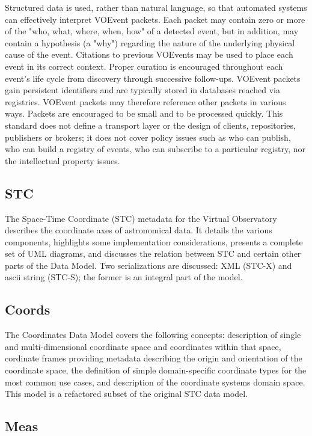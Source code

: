 \documentclass[11pt,a4paper]{ivoa}
\begin{document}
Structured data is used, rather than natural language, so that automated systems can effectively 
interpret VOEvent packets. Each packet may contain zero or more of the "who, what, where, when, how" 
of a detected event, but in addition, may contain a hypothesis (a "why") regarding the nature of 
the underlying physical cause of the event. Citations to previous VOEvents may be used to place 
each event in its correct context. Proper curation is encouraged throughout each event's life 
cycle from discovery through successive follow-ups. VOEvent packets gain persistent identifiers 
and are typically stored in databases reached via registries. VOEvent packets may therefore 
reference other packets in various ways. Packets are encouraged to be small and to be processed 
quickly. This standard does not define a transport layer or the design of clients, repositories, 
publishers or brokers; it does not cover policy issues such as who can publish, who can build a 
registry of events, who can subscribe to a particular registry, nor the intellectual property issues. 

\subsection{STC}

The Space-Time Coordinate (STC) metadata for the Virtual Observatory describes the coordinate 
axes of astronomical data. It details the various components, highlights some implementation 
considerations, presents a complete set of UML diagrams, and discusses the relation between 
STC and certain other parts of the Data Model. Two serializations are discussed: XML (STC-X) and
ascii string (STC-S); the former is an integral part of the model.

\subsection{Coords}

The Coordinates Data Model covers the following concepts: description of single and multi-dimensional 
coordinate space and coordinates within that space, cordinate frames providing metadata describing the 
origin and orientation of the coordinate space, the definition of simple domain-specific coordinate
types for the most common use cases, and description of the coordinate systems domain space. This
model is a refactored subset of the original STC data model.

\subsection{Meas}
\end{document}
